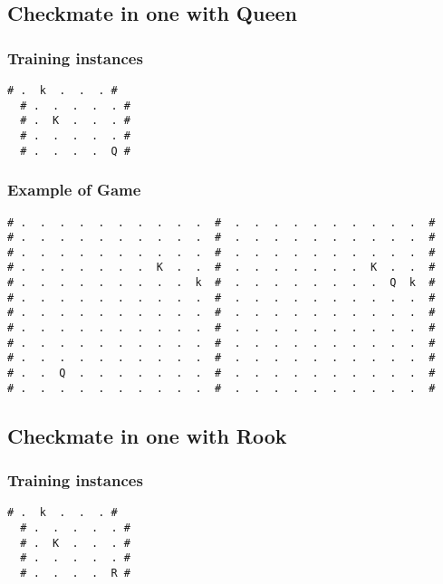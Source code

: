 \documentclass[a4paper]{article}
\begin{document}
\subsection{Checkmate in one with Queen}

\subsubsection{Training instances}
\begin{Verbatim}[fontsize=\footnotesize]
  # .  k  .  .  . #
  # .  .  .  .  . #
  # .  K  .  .  . #
  # .  .  .  .  . #
  # .  .  .  .  Q #
\end{Verbatim}

\subsubsection{Example of Game}
\begin{Verbatim}[fontsize=\footnotesize]
# .  .  .  .  .  .  .  .  .  .  #  .  .  .  .  .  .  .  .  .  .  #
# .  .  .  .  .  .  .  .  .  .  #  .  .  .  .  .  .  .  .  .  .  #
# .  .  .  .  .  .  .  .  .  .  #  .  .  .  .  .  .  .  .  .  .  #
# .  .  .  .  .  .  .  K  .  .  #  .  .  .  .  .  .  .  K  .  .  #
# .  .  .  .  .  .  .  .  .  k  #  .  .  .  .  .  .  .  .  Q  k  #
# .  .  .  .  .  .  .  .  .  .  #  .  .  .  .  .  .  .  .  .  .  #
# .  .  .  .  .  .  .  .  .  .  #  .  .  .  .  .  .  .  .  .  .  #
# .  .  .  .  .  .  .  .  .  .  #  .  .  .  .  .  .  .  .  .  .  #
# .  .  .  .  .  .  .  .  .  .  #  .  .  .  .  .  .  .  .  .  .  #
# .  .  .  .  .  .  .  .  .  .  #  .  .  .  .  .  .  .  .  .  .  #
# .  .  Q  .  .  .  .  .  .  .  #  .  .  .  .  .  .  .  .  .  .  #
# .  .  .  .  .  .  .  .  .  .  #  .  .  .  .  .  .  .  .  .  .  #
\end{Verbatim}

\subsection{Checkmate in one with Rook}

\subsubsection{Training instances}
\begin{Verbatim}[fontsize=\footnotesize]
  # .  k  .  .  . #
  # .  .  .  .  . #
  # .  K  .  .  . #
  # .  .  .  .  . #
  # .  .  .  .  R #
\end{Verbatim}
\end{document}
